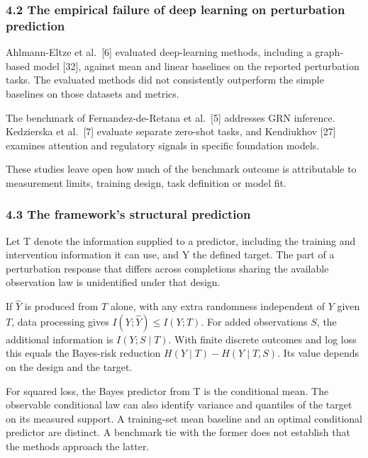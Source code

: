 \documentclass[
]{article}
\begin{document}
\hypertarget{the-empirical-failure-of-deep-learning-on-perturbation-prediction}{%
\subsubsection{4.2 The empirical failure of deep learning on
perturbation
prediction}\label{the-empirical-failure-of-deep-learning-on-perturbation-prediction}}

Ahlmann-Eltze et al.~{[}6{]} evaluated deep-learning methods, including
a graph-based model {[}32{]}, against mean and linear baselines on the
reported perturbation tasks. The evaluated methods did not consistently
outperform the simple baselines on those datasets and metrics.

The benchmark of Fernandez-de-Retana et al.~{[}5{]} addresses GRN
inference. Kedzierska et al.~{[}7{]} evaluate separate zero-shot tasks,
and Kendiukhov {[}27{]} examines attention and regulatory signals in
specific foundation models.

These studies leave open how much of the benchmark outcome is
attributable to measurement limits, training design, task definition or
model fit.

\hypertarget{the-frameworks-structural-prediction}{%
\subsubsection{4.3 The framework's structural
prediction}\label{the-frameworks-structural-prediction}}

Let T denote the information supplied to a predictor, including the
training and intervention information it can use, and Y the defined
target. The part of a perturbation response that differs across
completions sharing the available observation law is unidentified under
that design.

If \(\widehat{Y}\) is produced from \(T\) alone, with any extra
randomness independent of \(Y\) given \(T\), data processing gives
\(I(Y;\widehat{Y})\le I(Y;T)\). For added observations \(S\), the
additional information is \(I(Y;S\mid T)\). With finite discrete
outcomes and log loss this equals the Bayes-risk reduction
\(H(Y\mid T)-H(Y\mid T,S)\). Its value depends on the design and the
target.

For squared loss, the Bayes predictor from T is the conditional mean.
The observable conditional law can also identify variance and quantiles
of the target on its measured support. A training-set mean baseline and
an optimal conditional predictor are distinct. A benchmark tie with the
former does not establish that the methods approach the latter.
\end{document}
